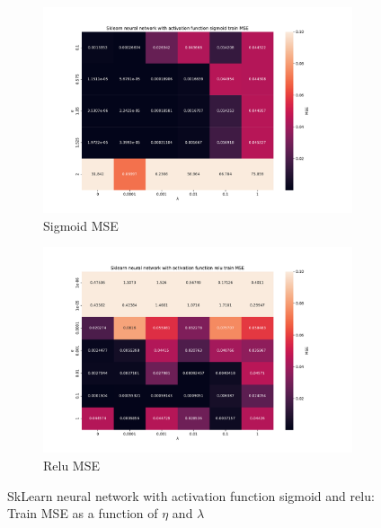 \begin{figure}[htpb]
\begin{subfigure}{.5\textwidth}
  \centering
  \includegraphics[width=1.2\linewidth]{Figures/PartB/train_sklearn_sigmoid_NN_MSE(eta,lmb)}
  \caption{Sigmoid MSE}
  \label{fig:train_leaky_relu_MSE-eta-lmb-}
\end{subfigure}%
\begin{subfigure}{.5\textwidth}
  \centering
  \includegraphics[width=1.2\linewidth]{Figures/PartB/train_sklearn_relu_NN_MSE(eta,lmb)}
  \caption{Relu MSE}
  \label{fig:test_leaky_relu_MSE-eta-lmb-}
\end{subfigure}
\caption{SkLearn neural network with activation function sigmoid and relu: Train MSE as a function of \(\eta \) and \(\lambda \) }
\label{fig:leaky_relu_MSE}
\end{figure}


